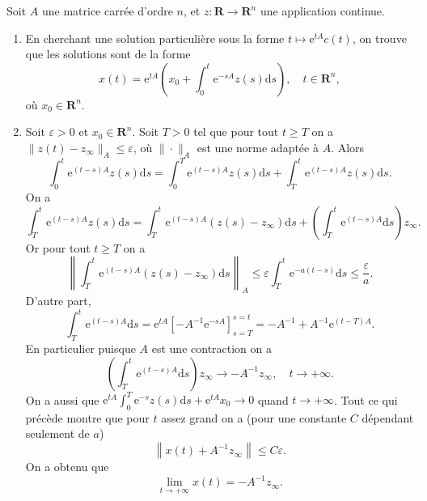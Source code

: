 \documentclass[a4paper,10pt,openany]{article}
\theoremstyle{plain}
\theoremstyle{definition}
\newcommand{\e}{\mathrm{e}}
\newcommand{\dd}{\mathrm{d}}
\newcommand{\R}{\mathbf{R}}
\begin{document}
\noindent Soit $A$ une matrice carr\'ee d'ordre $n$, et $z : \R \to \R^n$ une application continue. 

\begin{enumerate}
\item En cherchant une solution particuli\`ere sous la forme $t \mapsto \e^{tA}c(t)$, on trouve que les solutions sont de la forme
$$
x(t) = \e^{tA} \left(x_0 + \int_0^t \e^{-sA}z(s) \dd s\right), \quad t \in \R^n,
$$
o\`u $x_0 \in \R^n$.
\item Soit $\varepsilon > 0$ et $x_0 \in \R^n$. Soit $T > 0$ tel que pour tout $t \geqslant T$ on a $\|z(t)-z_\infty\|_A \leqslant \varepsilon$, o\`u $\|\cdot\|_A$ est une norme adapt\'ee \`a $A$. Alors 
$$
\int_0^t\e^{(t-s)A}z(s)\dd s = \int_0^T \e^{(t-s)A}z(s)\dd s + \int_T^t \e^{(t-s)A}z(s)\dd s.
$$
On a 
$$
\int_T^t \e^{(t-s)A}z(s)\dd s = \int_T^t\e^{(t-s)A}(z(s) - z_\infty) \dd s + \left(\int_T^t \e^{(t-s)A}\dd s \right)z_\infty.
$$
Or pour tout $t\geqslant T$ on a 
$$
\left\|\int_T^t\e^{(t-s)A}(z(s) - z_\infty) \dd s\right\|_A \leqslant \varepsilon \int_T^t \e^{-a(t-s)} \dd s \leqslant \frac{\varepsilon}{a}.
$$
D'autre part, 
$$
\int_{T}^t\e^{(t-s)A} \dd s = \e^{tA}\left[-A^{-1}\e^{-sA}\right]_{s=T}^{s=t} = -A^{-1} + A^{-1}\e^{(t-T)A}.
$$
En particulier puisque $A$ est une contraction on a
$$
\left(\int_T^t \e^{(t-s)A}\dd s \right)z_\infty \to -A^{-1}z_\infty, \quad t \to +\infty.
$$
On a aussi que $\displaystyle{\e^{tA} \int_0^T \e^{-s}z(s) \dd s + \e^{tA}x_0 \to 0}$ quand $t \to +\infty$. Tout ce qui pr\'ec\`ede montre que pour $t$ assez grand on a (pour une constante $C$ d\'ependant seulement de $a$)
$$
\left\|x(t) +A^{-1}z_\infty\right\| \leqslant C \varepsilon.
$$
On a obtenu que 
$$
\lim_{t \to +\infty} x(t) = -A^{-1} z_\infty.
$$
\end{enumerate}

\vspace{0.6cm}

 \vspace{1.5mm} 
\end{document}
